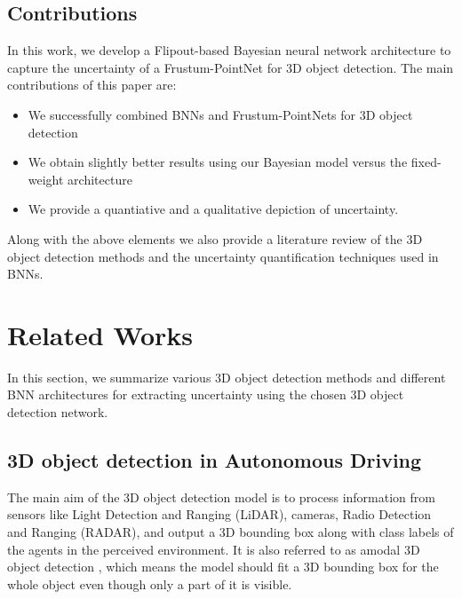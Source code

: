 \documentclass[10pt,twocolumn,letterpaper]{article}
\begin{document}
\subsection{Contributions}
In this work, we develop a Flipout-based Bayesian neural network \cite{Wen2018} architecture to capture the uncertainty of a Frustum-PointNet for 3D object detection. The main contributions of this paper are: 
\begin{itemize}
    \item We successfully combined BNNs and Frustum-PointNets for 3D object detection 
    \item We obtain slightly better results using our Bayesian model versus the fixed-weight architecture
    \item We provide a quantiative and a qualitative depiction of uncertainty.
\end{itemize}
    
    Along with the above elements we also provide a literature review of the 3D object detection methods and the uncertainty quantification techniques used in BNNs.
\section{Related Works}
In this section, we summarize various 3D object detection methods and different BNN architectures for extracting uncertainty using the chosen 3D object detection network.

\subsection{3D object detection in Autonomous Driving}
The main aim of the 3D object detection model is to process information from sensors like Light Detection and Ranging (LiDAR), cameras, Radio Detection and Ranging (RADAR), and output a 3D bounding box along with class labels of the agents in the perceived environment. It is also referred to as amodal 3D object detection \cite{Arnold2019}, which means the model should fit a 3D bounding box for the whole object even though only a part of it is visible.

\end{document}
